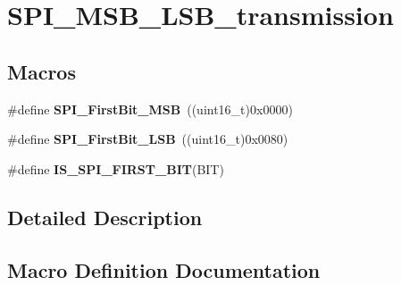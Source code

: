 \hypertarget{group___s_p_i___m_s_b___l_s_b__transmission}{}\section{S\+P\+I\+\_\+\+M\+S\+B\+\_\+\+L\+S\+B\+\_\+transmission}
\label{group___s_p_i___m_s_b___l_s_b__transmission}
\subsection*{Macros}
\begin{DoxyCompactItemize}
\item 
\hypertarget{group___s_p_i___m_s_b___l_s_b__transmission_ga45e688f93a93b605886240cad23bc2eb}{}\#define {\bfseries S\+P\+I\+\_\+\+First\+Bit\+\_\+\+M\+S\+B}~((uint16\+\_\+t)0x0000)\label{group___s_p_i___m_s_b___l_s_b__transmission_ga45e688f93a93b605886240cad23bc2eb}

\item 
\hypertarget{group___s_p_i___m_s_b___l_s_b__transmission_ga5ef57fca79434cbc517e4ede548ca02d}{}\#define {\bfseries S\+P\+I\+\_\+\+First\+Bit\+\_\+\+L\+S\+B}~((uint16\+\_\+t)0x0080)\label{group___s_p_i___m_s_b___l_s_b__transmission_ga5ef57fca79434cbc517e4ede548ca02d}

\item 
\#define {\bfseries I\+S\+\_\+\+S\+P\+I\+\_\+\+F\+I\+R\+S\+T\+\_\+\+B\+I\+T}(B\+I\+T)
\end{DoxyCompactItemize}


\subsection{Detailed Description}


\subsection{Macro Definition Documentation}
\hypertarget{group___s_p_i___m_s_b___l_s_b__transmission_gabee8e0302741f4a5c41b96af640c63ad}{}
